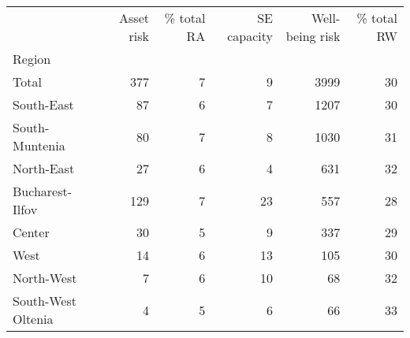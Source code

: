 \begin{tabular}{lrrrrr}
\toprule
{} &  Asset risk &  \% total RA &  SE capacity &  Well-being risk &  \% total RW \\
Region             &             &             &              &                  &             \\
\midrule
Total              &         377 &           7 &            9 &             3999 &          30 \\
South-East         &          87 &           6 &            7 &             1207 &          30 \\
South-Muntenia     &          80 &           7 &            8 &             1030 &          31 \\
North-East         &          27 &           6 &            4 &              631 &          32 \\
Bucharest-Ilfov    &         129 &           7 &           23 &              557 &          28 \\
Center             &          30 &           5 &            9 &              337 &          29 \\
West               &          14 &           6 &           13 &              105 &          30 \\
North-West         &           7 &           6 &           10 &               68 &          32 \\
South-West Oltenia &           4 &           5 &            6 &               66 &          33 \\
\bottomrule
\end{tabular}
